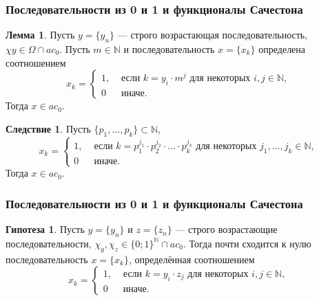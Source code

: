 \documentclass[10pt,pdf,hyperref={unicode},aspectratio=169,color={usenames, dvipsnames}]{beamer}\usepackage{amsmath}
\theoremstyle{definition}
\newtheorem{llemma}{Лемма}
\newtheorem{ccorollary}{Следствие}[llemma]
\newtheorem{hhypothesis}{Гипотеза}[llemma]
\begin{document}
\begin{frame}
	\frametitle{Последовательности из 0 и 1 и функционалы Сачестона}

	\begin{llemma}
		Пусть $y = \{y_n\}$ --- строго возрастающая последовательность,
		$\chi y\in\Omega \cap ac_0$.
		Пусть $m \in \mathbb{N}$
		и последовательность $x=\{x_k\}$ определена соотношением
		\begin{equation}
			x_k = \begin{cases}
				1, &\mbox{~если~} k = y_i \cdot m^j \mbox{~для некоторых~} i,j\in\mathbb{N},
				\\
				0  &\mbox{~иначе}
				.
			\end{cases}
		\end{equation}
		Тогда $x\in ac_0$.
	\end{llemma}

	\begin{ccorollary}
		\label{cor:ac0_powers_finite_set_of_numbers}
		Пусть $\{p_1, ..., p_k\} \subset \mathbb{N}$,
		\begin{equation}
			x_k = \begin{cases}
				1, &\mbox{~если~} k = p_1^{j_1}\cdot p_2^{j_2}\cdot ... \cdot p_k^{j_k} \mbox{~для некоторых~} j_1,...,j_k\in\mathbb{N},
				\\
				0  &\mbox{~иначе}.
			\end{cases}
		\end{equation}
		Тогда $x\in ac_0$.
	\end{ccorollary}

\end{frame}


\begin{frame}
	\frametitle{Последовательности из 0 и 1 и функционалы Сачестона}

	\begin{hhypothesis}
		Пусть $y=\{y_n\}$ и $z=\{z_n\}$ --- строго возрастающие последовательности,
		$\chi_y,\chi_z\in\{0;1\}^\mathbb{N} \cap ac_0$.
		Тогда почти сходится к нулю последовательность $x=\{x_k\}$, определённая соотношением
		\begin{equation}
			x_k = \begin{cases}
				1, &\mbox{~если~} k = y_i \cdot z_j \mbox{~для некоторых~} i,j\in\mathbb{N},
				\\
				0  &\mbox{~иначе}
				.
			\end{cases}
		\end{equation}
	\end{hhypothesis}
\end{frame}
\end{document}
